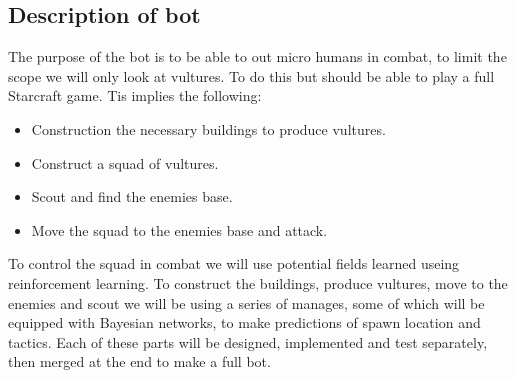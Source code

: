 \subsection*{Description of bot}
	The purpose of the bot is to be able to out micro humans in combat, to limit the scope we will only look at vultures. 
	To do this but should be able to play a full Starcraft game. Tis implies the following:
	\begin{itemize}
		\item Construction the necessary buildings to produce vultures.
		\item Construct a squad of vultures.
		\item Scout and find the enemies base.
		\item Move the squad to the enemies base and attack.
	\end{itemize}
	
	To control the squad in combat we will use potential fields learned useing reinforcement learning.
	To construct the buildings, produce vultures, move to the enemies and scout we will be using a series of manages, some of which will be equipped with Bayesian networks, to make predictions of spawn location and tactics.
	Each of these parts will be designed, implemented and test separately, then merged at the end to make a full bot.

